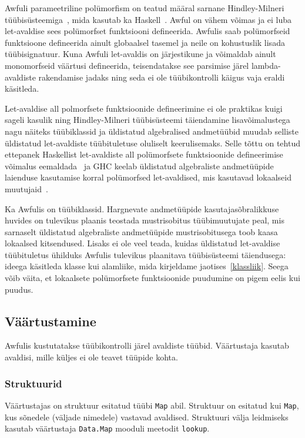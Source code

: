 \documentclass[12pt]{article}
\begin{document}
        Awfuli parameetriline polümorfism on teatud määral sarnane Hindley-Milneri tüübisüsteemiga~\cite{A}, mida kasutab ka Haskell~\cite{Has}. Awful on vähem võimas ja ei luba let-avaldise sees polümorfset funktsiooni defineerida. Awfulis saab polümorfseid funktsioone defineerida ainult globaalsel tasemel ja neile on kohustuslik lisada tüübisignatuur. Kuna Awfuli let-avaldis on järjestikune ja võimaldab ainult monomorfseid väärtusi defineerida, teisendatakse see parsimise järel lambda-avaldiste rakendamise jadaks ning seda ei ole tüübikontrolli käigus vaja eraldi käsitleda.

        Let-avaldise all polmorfsete funktsioonide defineerimine ei ole praktikas kuigi sageli kasulik ning Hindley-Milneri tüübisüsteemi täiendamine lisavõimalustega nagu näiteks tüübiklassid ja üldistatud algebralised andmetüübid muudab selliste üldistatud let-avaldiste tüübituletuse oluliselt keerulisemaks. Selle tõttu on tehtud ettepanek Haskellist let-avaldiste all polümorfsete funktsioonide defineerimise võimalus eemaldada~\cite{Let_Sho} ja GHC keelab üldistatud algebraliste andmetüüpide laienduse kasutamise korral polümorfsed let-avaldised, mis kasutavad lokaalseid muutujaid~\cite{Let_Gen}.

        Ka Awfulis on tüübiklassid. Hargnevate andmetüüpide kasutajasõbralikkuse huvides on tulevikus plaanis teostada mustrisobitus tüübimuutujate peal, mis sarnaselt üldistatud algebraliste andmetüüpide mustrisobitusega toob kaasa lokaalsed kitsendused. Lisaks ei ole veel teada, kuidas üldistatud let-avaldise tüübituletus ühilduks Awfulis tulevikus plaanitava tüübisüsteemi täiendusega: ideega käsitleda klasse kui alamliike, mida kirjeldame jaotises~\ref{klassliik}. Seega võib väita, et lokaalsete polümorfsete funktsioonide puudumine on pigem eelis kui puudus.
    \subsection{Väärtustamine}
      Awfulis kustutatakse tüübikontrolli järel avaldiste tüübid. Väärtustaja kasutab avaldisi, mille küljes ei ole teavet tüüpide kohta.
      \subsubsection{Struktuurid}
        Väärtustajas on struktuur esitatud tüübi \verb!Map! abil. Struktuur on esitatud kui \verb!Map!, kus sõnedele (väljade nimedele) vastavad avaldised. Struktuuri välja leidmiseks kasutab väärtustaja \verb!Data.Map! mooduli meetodit \verb!lookup!.
\end{document}
